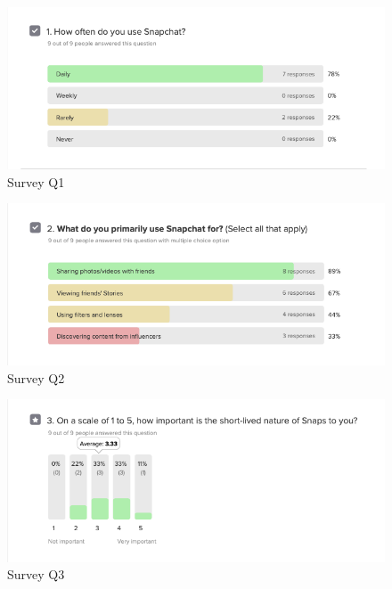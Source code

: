\documentclass{article}
\begin{document}
\newpage
\begin{figure}[h!]
    \centering
    \includegraphics[scale=0.6]{survey figure 1.png}
    \caption{Survey Q1}
    \label{fig:label}
\end{figure}

\begin{figure}[h!]
    \centering
    \includegraphics[scale=0.6]{survey figure 2.png}
    \caption{Survey Q2}
    \label{fig:label}
\end{figure}

\begin{figure}[h!]
    \centering
    \includegraphics[scale=0.6]{survey figure 3.png}
    \caption{Survey Q3}
    \label{fig:label}
\end{figure}
\end{document}
